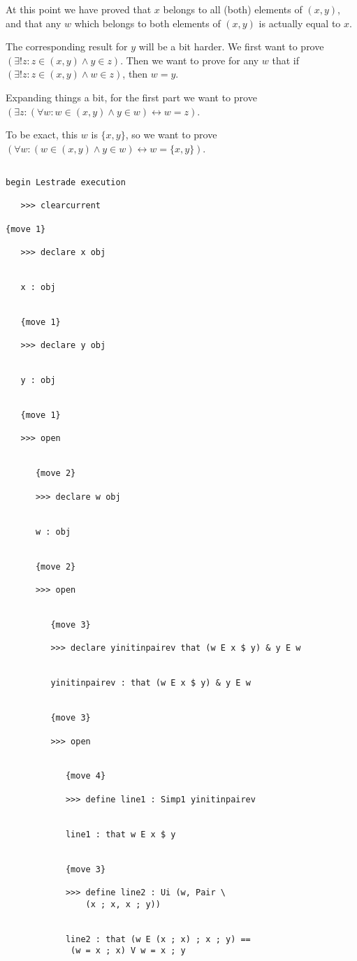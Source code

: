 \documentclass[12pt]{article}
\begin{document}
At this point we have proved that $x$ belongs to all (both) elements of $(x,y)$, and that any $w$ which belongs to both elements of $(x,y)$ is actually equal to $x$.

The corresponding result for $y$ will be a bit harder.  We first want to prove $(\exists! z: z \in (x,y) \wedge y \in z)$.
Then we want to prove for any $w$ that if $(\exists! z: z \in (x,y) \wedge w \in z)$, then $w=y$.

Expanding things a bit, for the first part we want to prove $(\exists z:(\forall w: w \in (x,y) \wedge y \in w) \leftrightarrow w=z)$.

To be exact, this $w$ is $\{x,y\}$, so we want to prove $(\forall w: (w \in (x,y) \wedge y \in w) \leftrightarrow w = \{x,y\})$.

\begin{verbatim}

begin Lestrade execution

   >>> clearcurrent

{move 1}

   >>> declare x obj


   x : obj


   {move 1}

   >>> declare y obj


   y : obj


   {move 1}

   >>> open


      {move 2}

      >>> declare w obj


      w : obj


      {move 2}

      >>> open


         {move 3}

         >>> declare yinitinpairev that (w E x $ y) & y E w


         yinitinpairev : that (w E x $ y) & y E w


         {move 3}

         >>> open


            {move 4}

            >>> define line1 : Simp1 yinitinpairev


            line1 : that w E x $ y


            {move 3}

            >>> define line2 : Ui (w, Pair \
                (x ; x, x ; y))


            line2 : that (w E (x ; x) ; x ; y) == 
             (w = x ; x) V w = x ; y



\end{verbatim}
\end{document}
